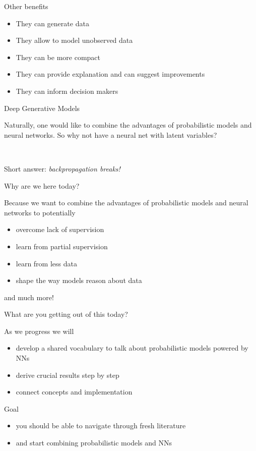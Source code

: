 \begin{frame}{Other benefits}

	\begin{itemize}
		\item They can generate data
		\item They allow to model unobserved data
		\item They can be more compact
		\item They can provide explanation and can suggest improvements
		\item They can inform decision makers
	\end{itemize}
	
\end{frame}



\begin{frame}{Deep Generative Models}

	Naturally, one would like to combine the advantages of probabilistic models and neural networks. So why not have a neural net with latent variables?
	
	~ \pause
	
	Short answer: \emph{backpropagation breaks!}
\end{frame}

\begin{frame}{Why are we here today?}

	Because we want to combine the advantages of probabilistic models and neural networks to potentially 
	\begin{itemize}
		\item overcome lack of supervision
		\item learn from partial supervision
		\item learn from less data
		\item shape the way models reason about data
	\end{itemize}
	and much more!
	
\end{frame}

\begin{frame}{What are you getting out of this today?}

	As we progress we will
	\begin{itemize}
		\item develop a shared vocabulary to talk about probabilistic models powered by NNs
		\item derive crucial results step by step
		\item connect concepts and implementation
	\end{itemize}

	\pause

	Goal
	\begin{itemize}
		\item you should be able to navigate through fresh literature
		\item and start combining probabilistic models and NNs
	\end{itemize}

\end{frame}

